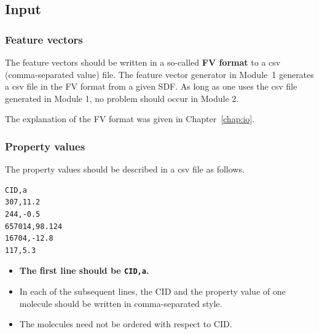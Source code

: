 \documentclass[11pt,titlepage,dvipdfmx,twoside]{book}
\newcommand{\chapref}[1]{Chapter~\ref{chap:#1}}
\begin{document}
\subsection{Input}
\subsubsection{Feature vectors}
The feature vectors should be written in
a so-called {\bf FV format} to
a csv (comma-separated value) file. 
%
The feature vector generator in Module~1
generates a csv file in the FV format
from a given SDF.
As long as one uses the csv file generated in Module 1,
no problem should occur in Module 2. 

The explanation of the FV format was given in \chapref{io}.



\subsubsection{Property values}
The property values should be described in a csv file as follows.  
\begin{oframed}
  {\small
\begin{verbatim}
CID,a
307,11.2
244,-0.5
657014,98.124
16704,-12.8
117,5.3
\end{verbatim}
}
\end{oframed}
\begin{itemize}
\item {\bf The first line should be \verb|CID,a|. }
\item In each of the subsequent lines,
 the  CID and the property value of one molecule
  should be written in comma-separated style. 
\item The molecules need not be ordered with respect to CID. 
\end{itemize}
  
\end{document}
